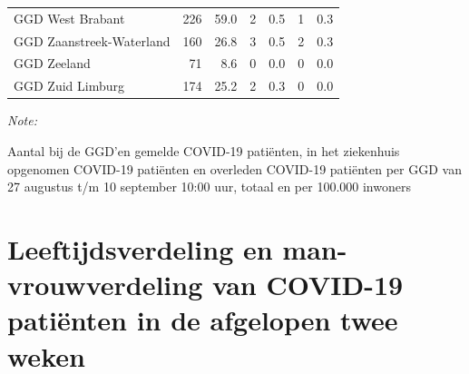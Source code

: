 \documentclass[
  english,
  man,floatsintext]{apa6}
\begin{document}
\begin{table}[H]
\begin{threeparttable}
\begin{tabular}{lrrrrrr}
GGD West Brabant & 226 & 59.0 & 2 & 0.5 & 1 & 0.3\\
GGD Zaanstreek-Waterland & 160 & 26.8 & 3 & 0.5 & 2 & 0.3\\
GGD Zeeland & 71 & 8.6 & 0 & 0.0 & 0 & 0.0\\
GGD Zuid Limburg & 174 & 25.2 & 2 & 0.3 & 0 & 0.0\\
\bottomrule
\end{tabular}
\begin{tablenotes}
\item \textit{Note: } 
\item Aantal bij de GGD’en gemelde COVID-19 patiënten, in het ziekenhuis opgenomen COVID-19 patiënten en overleden COVID-19 patiënten per GGD van 27 augustus t/m 10 september 10:00 uur, totaal en per 100.000 inwoners
\end{tablenotes}
\end{threeparttable}
\endgroup{}
\end{table}

\newpage

\hypertarget{leeftijdsverdeling-en-man-vrouwverdeling-van-covid-19-patiuxebnten-in-de-afgelopen-twee-weken}{%
\section{Leeftijdsverdeling en man-vrouwverdeling van COVID-19 patiënten in de afgelopen twee weken}\label{leeftijdsverdeling-en-man-vrouwverdeling-van-covid-19-patiuxebnten-in-de-afgelopen-twee-weken}}
\end{document}
